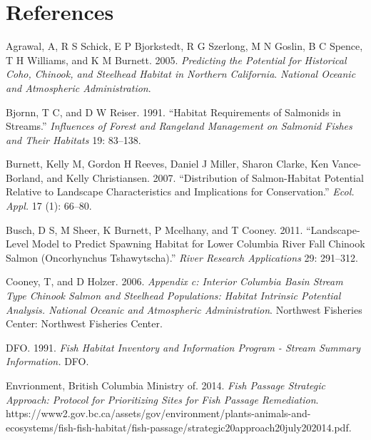 \documentclass[
  letterpaper,
  DIV=11,
  numbers=noendperiod]{scrreprt}
\newlength{\cslhangindent}
\newenvironment{CSLReferences}[2] %
 {\begin{list}{}{%
  \setlength{\itemindent}{0pt}
  \setlength{\leftmargin}{0pt}
  \setlength{\parsep}{0pt}
  \ifodd #1
   \setlength{\leftmargin}{\cslhangindent}
   \setlength{\itemindent}{-1\cslhangindent}
  \fi
  \setlength{\itemsep}{#2\baselineskip}}}
 {\end{list}}
\begin{document}

\chapter*{References}\label{references}


\label{refs}
\begin{CSLReferences}{1}{0}
Agrawal, A, R S Schick, E P Bjorkstedt, R G Szerlong, M N Goslin, B C
Spence, T H Williams, and K M Burnett. 2005. \emph{Predicting the
Potential for Historical Coho, Chinook, and Steelhead Habitat in
Northern California}. \emph{National Oceanic and Atmospheric
Administration}.

Bjornn, T C, and D W Reiser. 1991. {``Habitat Requirements of Salmonids
in Streams.''} \emph{Influences of Forest and Rangeland Management on
Salmonid Fishes and Their Habitats} 19: 83--138.

Burnett, Kelly M, Gordon H Reeves, Daniel J Miller, Sharon Clarke, Ken
Vance-Borland, and Kelly Christiansen. 2007. {``Distribution of
Salmon-Habitat Potential Relative to Landscape Characteristics and
Implications for Conservation.''} \emph{Ecol. Appl.} 17 (1): 66--80.

Busch, D S, M Sheer, K Burnett, P Mcelhany, and T Cooney. 2011.
{``Landscape-Level Model to Predict Spawning Habitat for Lower Columbia
River Fall Chinook Salmon (Oncorhynchus Tshawytscha).''} \emph{River
Research Applications} 29: 291--312.

Cooney, T, and D Holzer. 2006. \emph{Appendix c: Interior Columbia Basin
Stream Type Chinook Salmon and Steelhead Populations: Habitat Intrinsic
Potential Analysis. National Oceanic and Atmospheric Administration}.
Northwest Fisheries Center: Northwest Fisheries Center.

DFO. 1991. \emph{Fish Habitat Inventory and Information Program - Stream
Summary Information.} DFO.

Envrionment, British Columbia Ministry of. 2014. \emph{Fish Passage
Strategic Approach: Protocol for Prioritizing Sites for Fish Passage
Remediation}.
https://www2.gov.bc.ca/assets/gov/environment/plants-animals-and-ecosystems/fish-fish-habitat/fish-passage/strategic20approach20july202014.pdf.


\end{CSLReferences}
\end{document}
